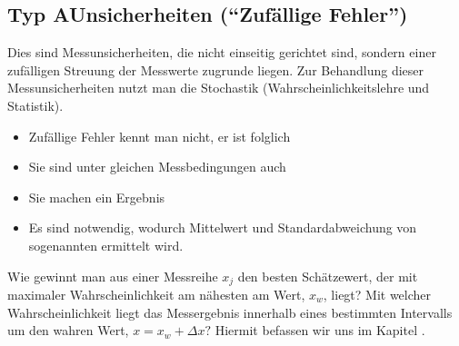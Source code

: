 \documentclass[letterpaper,10pt,english]{jupyterBook}
\begin{document}
\subsection{Typ A\sphinxhyphen{}Unsicherheiten (“Zufällige Fehler”)}
\label{\detokenize{content/1_Messunsicherheiten:typ-a-unsicherheiten-zufallige-fehler}}
\sphinxAtStartPar
Dies sind Messunsicherheiten, die nicht einseitig gerichtet sind, sondern einer zufälligen Streuung der Messwerte zugrunde liegen. Zur Behandlung dieser Messunsicherheiten nutzt man die Stochastik (Wahrscheinlichkeitslehre und Statistik).
\begin{itemize}
\item {} 
\sphinxAtStartPar
Zufällige Fehler kennt man nicht, er ist folglich 

\item {} 
\sphinxAtStartPar
Sie sind unter gleichen Messbedingungen auch 

\item {} 
\sphinxAtStartPar
Sie machen ein Ergebnis 

\item {} 
\sphinxAtStartPar
Es sind  notwendig, wodurch Mittelwert und Standardabweichung von sogenannten  ermittelt wird.

\end{itemize}

\sphinxAtStartPar
Wie gewinnt man aus einer Messreihe \(x_j\) den besten Schätzewert, der mit maximaler Wahrscheinlichkeit am nähesten am  Wert, \(x_w\), liegt? Mit welcher Wahrscheinlichkeit liegt das Messergebnis innerhalb eines bestimmten Intervalls um den wahren Wert, \(x = x_w + \Delta x ?\) Hiermit befassen wir uns im Kapitel {\hyperref[\detokenize{content/1_Mittelwert_StdAbw::doc}]{}}.
\end{document}
